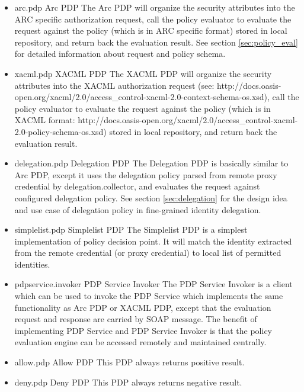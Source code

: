 \documentclass{article}                            %
\begin{document}
\begin{itemize}
    \item arc.pdp Arc PDP
The Arc PDP will organize the security attributes into the ARC specific authorization request, call the policy evaluator to evaluate the request against the policy (which is in ARC specific format) stored in local repository, and return back the evaluation result. See section \ref{sec:policy_eval} for detailed information about request and policy schema.

    \item xacml.pdp XACML PDP
The XACML PDP will organize the security attributes into the XACML authorization request (see: http://docs.oasis-open.org/xacml/2.0/access\_control-xacml-2.0-context-schema-os.xsd), call the policy evaluator to evaluate the request against the policy (which is in XACML format: http://docs.oasis-open.org/xacml/2.0/access\_control-xacml-2.0-policy-schema-os.xsd) stored in local repository, and return back the evaluation result.

    \item delegation.pdp Delegation PDP
The Delegation PDP is basically similar to Arc PDP, except it uses the delegation policy parsed from remote proxy credential by delegation.collector, and evaluates the request against configured delegation policy. See section \ref{sec:delegation} for the design idea and use case of delegation policy in fine-grained identity delegation.

    \item simplelist.pdp Simplelist PDP
The Simplelist PDP is a simplest implementation of policy decision point. It will match the identity extracted from the remote credential (or proxy credential) to local list of permitted identities.

    \item pdpservice.invoker PDP Service Invoker
The PDP Service Invoker is a client which can be used to invoke the PDP Service which implements the same functionality as Arc PDP or XACML PDP, except that the evaluation request and response are carried by SOAP message. The benefit of implementing PDP Service and PDP Service Invoker is that the policy evaluation engine can be accessed remotely and maintained centrally.

    \item allow.pdp Allow PDP
This PDP always returns positive result.

    \item deny.pdp Deny PDP
This PDP always returns negative result.

\end{itemize}
\end{document}
